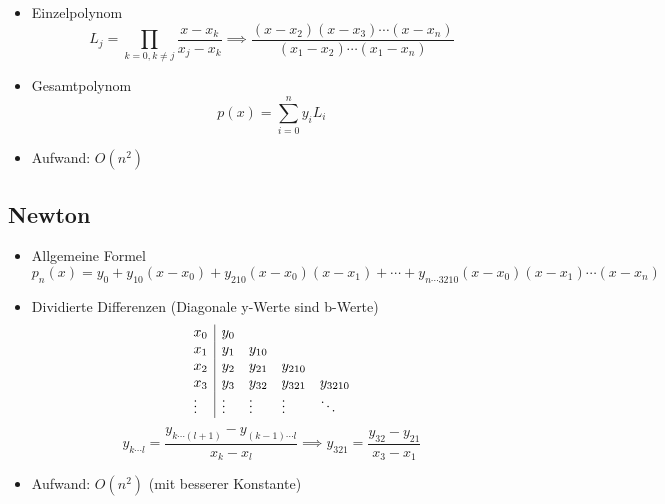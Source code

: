 \begin{itemize}
	
	\item Einzelpolynom \\
	\begin{displaymath}
		L_{j} = \prod_{k=0, k\neq j} \frac{x - x_{k}}{x_{j} - x_{k}}
		\implies
		\frac{(x - x_{2}) (x - x_{3}) \cdots (x - x_{n})}{(x_{1} - x_{2}) \cdots (x_{1} - x_{n})}
	\end{displaymath}
	
	\item Gesamtpolynom \\
	\begin{equation*}
		p(x) = \sum_{i=0}^{n} y_{i} L_{i}
	\end{equation*}
	
	\item Aufwand: $O(n^{2})$
	
\end{itemize}

\subsection{Newton}

\begin{itemize}
	
	\item Allgemeine Formel \\
	\begin{equation*}
		p_n(x) = y_0 + y_{10} (x - x_0) + y_{210} (x - x_0)(x - x_1) + \cdots + y_{n\cdots 3210} (x - x_0)(x - x_1) \cdots (x - x_n)
	\end{equation*}
	
	\item Dividierte Differenzen (Diagonale y-Werte sind b-Werte)\\
	\begin{displaymath}
		\begin{array}{l | l l l l}
			x_0		& y_0 		\\
			x_1		& y_1		& y_{10}	\\
			x_2		& y_2		& y_{21}	& y_{210}	\\
			x_3		& y_3		& y_{32}	& y_{321}	& y_{3210} \\
			\vdots	& \vdots	& \vdots	& \vdots	& \ddots \\
		\end{array}
	\end{displaymath}
	\begin{displaymath}
		y_{k\cdots l} = \frac{y_{k\cdots (l+1)} - y_{(k-1)\cdots l}}{x_k - x_l}
		\implies
		y_{321} = \frac{y_{32} - y_{21}}{x_3 - x_1}
	\end{displaymath}
	
	\item Aufwand: $O(n^2)$ (mit besserer Konstante)
	
\end{itemize}

